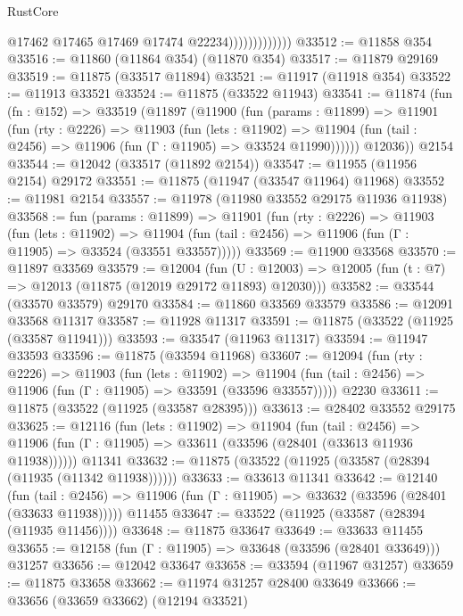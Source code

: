 \begin{lexlean}{RustCore}
\begin{coremodule}
                              @17462
                              @17465
                              @17469
                              @17474
                              @22234)))))))))))))
@33512 := @11858 @354
@33516 := @11860 (@11864 @354) (@11870 @354)
@33517 := @11879 @29169
@33519 := @11875 (@33517 @11894)
@33521 := @11917 (@11918 @354)
@33522 := @11913 @33521
@33524 := @11875 (@33522 @11943)
@33541 := @11874
    (fun (fn : @152) =>
    @33519
      (@11897
        (@11900
          (fun (params : @11899) =>
          @11901
            (fun (rty : @2226) =>
            @11903
              (fun (lets : @11902) =>
              @11904 (fun (tail : @2456) => @11906 (fun (Γ : @11905) => @33524 @11990))))))
        @12036))
    @2154
@33544 := @12042 (@33517 (@11892 @2154))
@33547 := @11955 (@11956 @2154) @29172
@33551 := @11875 (@11947 (@33547 @11964) @11968)
@33552 := @11981 @2154
@33557 := @11978 (@11980 @33552 @29175 @11936 @11938)
@33568 := fun (params : @11899) =>
  @11901
    (fun (rty : @2226) =>
    @11903
      (fun (lets : @11902) =>
      @11904 (fun (tail : @2456) => @11906 (fun (Γ : @11905) => @33524 (@33551 @33557)))))
@33569 := @11900 @33568
@33570 := @11897 @33569
@33579 := @12004
    (fun (U : @12003) => @12005 (fun (t : @7) => @12013 (@11875 (@12019 @29172 @11893) @12030)))
@33582 := @33544 (@33570 @33579) @29170
@33584 := @11860 @33569 @33579
@33586 := @12091 @33568 @11317
@33587 := @11928 @11317
@33591 := @11875 (@33522 (@11925 (@33587 @11941)))
@33593 := @33547 (@11963 @11317)
@33594 := @11947 @33593
@33596 := @11875 (@33594 @11968)
@33607 := @12094
    (fun (rty : @2226) =>
    @11903
      (fun (lets : @11902) =>
      @11904 (fun (tail : @2456) => @11906 (fun (Γ : @11905) => @33591 (@33596 @33557)))))
    @2230
@33611 := @11875 (@33522 (@11925 (@33587 @28395)))
@33613 := @28402 @33552 @29175
@33625 := @12116
    (fun (lets : @11902) =>
    @11904
      (fun (tail : @2456) =>
      @11906 (fun (Γ : @11905) => @33611 (@33596 (@28401 (@33613 @11936 @11938))))))
    @11341
@33632 := @11875 (@33522 (@11925 (@33587 (@28394 (@11935 (@11342 @11938))))))
@33633 := @33613 @11341
@33642 := @12140
    (fun (tail : @2456) => @11906 (fun (Γ : @11905) => @33632 (@33596 (@28401 (@33633 @11938)))))
    @11455
@33647 := @33522 (@11925 (@33587 (@28394 (@11935 @11456))))
@33648 := @11875 @33647
@33649 := @33633 @11455
@33655 := @12158 (fun (Γ : @11905) => @33648 (@33596 (@28401 @33649))) @31257
@33656 := @12042 @33647
@33658 := @33594 (@11967 @31257)
@33659 := @11875 @33658
@33662 := @11974 @31257 @28400 @33649
@33666 := @33656 (@33659 @33662) (@12194 @33521)

\end{coremodule}
\end{lexlean}
